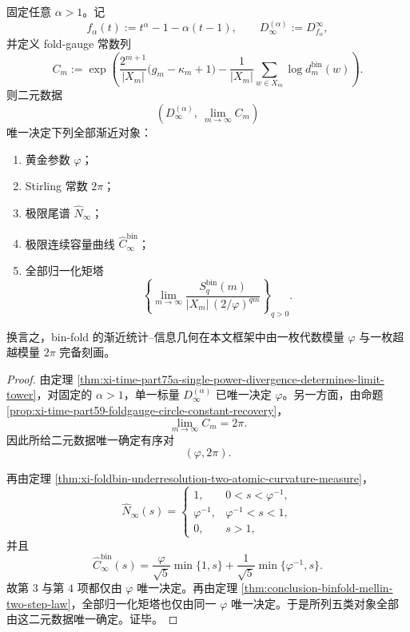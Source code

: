 \begin{theorem}[折叠统计的二常数完备性]\label{thm:conclusion-binfold-two-constant-completeness}
固定任意 \(\alpha>1\)。记
\[
f_\alpha(t):=t^\alpha-1-\alpha(t-1),
\qquad
D_\infty^{(\alpha)}:=D_{f_\alpha}^\infty,
\]
并定义 fold-gauge 常数列
\[
C_m:=
\exp\!\left(
\frac{2^{m+1}}{|X_m|}\bigl(g_m-\kappa_m+1\bigr)
-\frac{1}{|X_m|}\sum_{w\in X_m}\log d_m^{\mathrm{bin}}(w)
\right).
\]
则二元数据
\[
\left(D_\infty^{(\alpha)},\ \lim_{m\to\infty}C_m\right)
\]
唯一决定下列全部渐近对象：
\begin{enumerate}
  \item 黄金参数 \(\varphi\)；
  \item Stirling 常数 \(2\pi\)；
  \item 极限尾谱 \(\widehat N_\infty\)；
  \item 极限连续容量曲线 \(\widehat C_\infty^{\mathrm{bin}}\)；
  \item 全部归一化矩塔
  \[
  \left\{
  \lim_{m\to\infty}
  \frac{S_q^{\mathrm{bin}}(m)}{|X_m|\,(2/\varphi)^{qm}}
  \right\}_{q>0}.
  \]
\end{enumerate}
换言之，bin-fold 的渐近统计--信息几何在本文框架中由一枚代数模量 \(\varphi\) 与一枚超越模量 \(2\pi\) 完备刻画。
\end{theorem}
\begin{proof}
由定理 \ref{thm:xi-time-part75a-single-power-divergence-determines-limit-tower}，对固定的 \(\alpha>1\)，单一标量 \(D_\infty^{(\alpha)}\) 已唯一决定 \(\varphi\)。另一方面，由命题 \ref{prop:xi-time-part59-foldgauge-circle-constant-recovery}，
\[
\lim_{m\to\infty}C_m=2\pi.
\]
因此所给二元数据唯一确定有序对
\[
(\varphi,2\pi).
\]

再由定理 \ref{thm:xi-foldbin-underresolution-two-atomic-curvature-measure}，
\[
\widehat N_\infty(s)=
\begin{cases}
1,& 0<s<\varphi^{-1},\\[2pt]
\varphi^{-1},& \varphi^{-1}<s<1,\\[2pt]
0,& s>1,
\end{cases}
\]
并且
\[
\widehat C_\infty^{\mathrm{bin}}(s)
=
\frac{\varphi}{\sqrt5}\min\{1,s\}
+
\frac{1}{\sqrt5}\min\{\varphi^{-1},s\}.
\]
故第 \(3\) 与第 \(4\) 项都仅由 \(\varphi\) 唯一决定。再由定理 \ref{thm:conclusion-binfold-mellin-two-step-law}，全部归一化矩塔也仅由同一 \(\varphi\) 唯一决定。于是所列五类对象全部由这二元数据唯一确定。证毕。
\end{proof}

